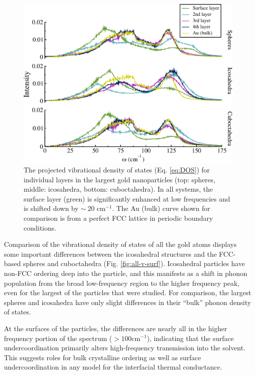 \begin{figure}
	\includegraphics[width=\linewidth]{figures/col-layer40.pdf}
	\caption{The projected vibrational density of states
          (Eq. \ref{eq:DOS}) for individual layers in the largest gold
          nanoparticles (top: spheres, middle: icosahedra, bottom:
          cuboctahedra). In all systems, the surface layer (green) is
          significantly enhanced at low frequencies and is shifted
          down by $\sim~20\text{~cm}^{-1}$. The Au (bulk) curve shown
          for comparison is from a perfect FCC lattice in periodic
          boundary conditions.}
	\label{fig:layer}
\end{figure}

Comparison of the vibrational density of states of all the gold atoms
displays some important differences between the icosahedral structures
and the FCC-based spheres and cuboctahedra
(Fig. \ref{fig:all-v-surf}).  Icosahedral particles have non-FCC
ordering deep into the particle, and this manifests as a shift in
phonon population from the broad low-frequency region to the higher
frequency peak, even for the largest of the particles that were
studied.  For comparison, the largest spheres and icosahedra have only
slight differences in their ``bulk'' phonon density of states.

At the surfaces of the particles, the differences are nearly all in
the higher frequency portion of the spectrum ($>100 \text{cm}^{-1}$),
indicating that the surface undercoordination primarily alters
high-frequency transmission into the solvent.  This suggests roles for
bulk crystalline ordering as well as surface undercoordination in any
model for the interfacial thermal conductance.

